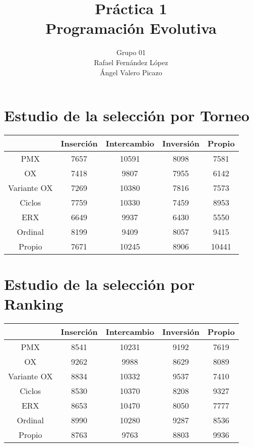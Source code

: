\documentclass[12pt]{article}
\title{Práctica 1\\Programación Evolutiva}
\author{Grupo 01\\Rafael Fernández López\\Ángel Valero Picazo}
\date{}
\begin{document}
\maketitle
\newpage
\newpage
\tableofcontents
\newpage

\section{Estudio de la selección por Torneo}	

\begin{table}[H]
\begin{center}
\begin{tabular}{|ccccc|} \hline
	   & Inserción & Intercambio & Inversión & Propio \\  \hline
PMX 	   &  7657 & 10591 & 8098 & 7581 \\ 
OX 	   & 7418 & 9807 & 7955 & 6142  \\ 
Variante OX & 7269 & 10380 & 7816 & 7573 \\
Ciclos 	   & 7759 & 10330 & 7459 & 8953 \\
ERX 	   & 6649 & 9937 & 6430 & 5550 \\
Ordinal    & 8199 & 9409 & 8057 & 9415 \\
Propio     & 7671 & 10245 & 8906 & 10441 \\  \hline
\end{tabular}
\end{center}
\end{table}

\section{Estudio de la selección por Ranking}	

\begin{table}[H]
\begin{center}
\begin{tabular}{|ccccc|} \hline
	   & Inserción & Intercambio & Inversión & Propio \\  \hline
PMX 	   &  8541 & 10231 & 9192 & 7619 \\ 
OX 	   & 9262 & 9988 & 8629 & 8089  \\ 
Variante OX & 8834 & 10332 & 9537 & 7410 \\
Ciclos 	   & 8530 & 10370 & 8208 & 9327 \\
ERX 	   & 8653 & 10470 & 8050 & 7777 \\
Ordinal    & 8990 & 10280 & 9287 & 8536 \\
Propio     & 8763 & 9763 & 8803 & 9936 \\  \hline
\end{tabular}
\end{center}
\end{table}
\end{document}

